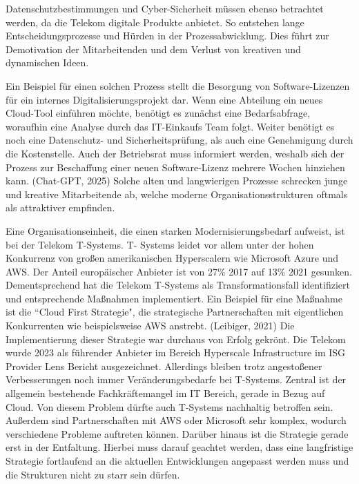 \documentclass[12pt,a4paper]{article}
\newcommand{\zitat}[1]{\parencite{#1}}
\begin{document}
	\noindent Datenschutzbestimmungen und Cyber-Sicherheit müssen ebenso betrachtet
	werden, da die Telekom digitale Produkte anbietet. So entstehen lange
	Entscheidungsprozesse und Hürden in der Prozessabwicklung. Dies führt
	zur Demotivation der Mitarbeitenden und dem Verlust von kreativen und
	dynamischen Ideen.
	
	\noindent Ein Beispiel für einen solchen Prozess stellt die Besorgung von
	Software-Lizenzen für ein internes Digitalisierungsprojekt dar. Wenn
	eine Abteilung ein neues Cloud-Tool einführen möchte, benötigt es
	zunächst eine Bedarfsabfrage, woraufhin eine Analyse durch das
	IT-Einkaufs Team folgt. Weiter benötigt es noch eine Datenschutz- und
	Sicherheitsprüfung, als auch eine Genehmigung durch die Kostenstelle.
	Auch der Betriebsrat muss informiert werden, weshalb sich der Prozess
	zur Beschaffung einer neuen Software-Lizenz mehrere Wochen hinziehen
	kann. (Chat-GPT, 2025) Solche alten und langwierigen Prozesse schrecken
	junge und kreative Mitarbeitende ab, welche moderne
	Organisationsstrukturen oftmals als attraktiver empfinden.
	
	\noindent Eine Organisationseinheit, die einen starken Modernisierungsbedarf
	aufweist, ist bei der Telekom T-Systems. T- Systems leidet vor allem
	unter der hohen Konkurrenz von großen amerikanischen Hyperscalern wie
	Microsoft Azure und AWS. Der Anteil europäischer Anbieter ist von 27\%
	2017 auf 13\% 2021 gesunken.\zitat{morris2022} Dementsprechend hat die
	Telekom T-Systems als Transformationsfall identifiziert und
	entsprechende Maßnahmen implementiert. Ein Beispiel für eine Maßnahme
	ist die ``Cloud First Strategie", die strategische Partnerschaften mit
	eigentlichen Konkurrenten wie beispielsweise AWS anstrebt. (Leibiger,
	2021) Die Implementierung dieser Strategie war durchaus von Erfolg
	gekrönt. Die Telekom wurde 2023 als führender Anbieter im Bereich
	Hyperscale Infrastructure im ISG Provider Lens Bericht ausgezeichnet.
	Allerdings bleiben trotz angestoßener Verbesserungen noch immer
	Veränderungsbedarfe bei T-Systems. Zentral ist der allgemein bestehende
	Fachkräftemangel im IT Bereich, gerade in Bezug auf Cloud. \zitat{koehler2023} Von diesem Problem dürfte auch T-Systems nachhaltig betroffen
	sein. Außerdem sind Partnerschaften mit AWS oder Microsoft sehr komplex,
	wodurch verschiedene Probleme auftreten können. \zitat{t-systems2024sla}
	Darüber hinaus ist die Strategie gerade erst in der Entfaltung. Hierbei
	muss darauf geachtet werden, dass eine langfristige Strategie
	fortlaufend an die aktuellen Entwicklungen angepasst werden muss und die
	Strukturen nicht zu starr sein dürfen.
	
\end{document}
